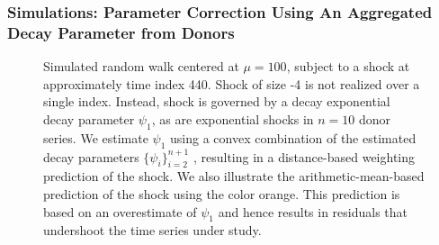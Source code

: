 \documentclass[9pt]{beamer}
\theoremstyle{definition}
\begin{document}
    \begin{frame}
        \fontsize{8pt}{9pt}
        
        \frametitle{Simulations: Parameter Correction Using An Aggregated Decay Parameter from Donors}
    \begin{figure}[h!]
      \begin{center}
        \caption{Simulated random walk centered at $\mu = 100$, subject to a shock at approximately time index 440.  Shock of size -4 is not realized over a single index.  Instead, shock is governed by a decay exponential decay parameter $\psi_{1}$, as are exponential shocks in $n = 10$ donor series.  We estimate $\psi_{1}$ using a convex combination of the estimated decay parameters $\{\psi_{i}\}_{i=2}^{n+1}$ , resulting in a distance-based weighting prediction of the shock.  We also illustrate the arithmetic-mean-based prediction of the shock using the color orange.  This prediction is based on an overestimate of $\psi_{1}$ and hence results in residuals that undershoot the time series under study.} 
     
        \end{center}
      \end{figure}
      
    \end{frame}
\end{document}
